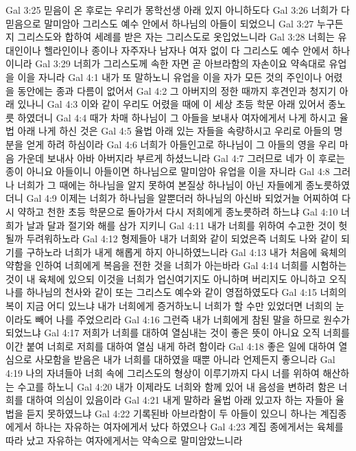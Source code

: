 Gal 3:25  믿음이 온 후로는 우리가 몽학선생 아래 있지 아니하도다
Gal 3:26  너희가 다 믿음으로 말미암아 그리스도 예수 안에서 하나님의 아들이 되었으니
Gal 3:27  누구든지 그리스도와 합하여 세례를 받은 자는 그리스도로 옷입었느니라
Gal 3:28  너희는 유대인이나 헬라인이나 종이나 자주자나 남자나 여자 없이 다 그리스도 예수 안에서 하나이니라
Gal 3:29  너희가 그리스도께 속한 자면 곧 아브라함의 자손이요 약속대로 유업을 이을 자니라
Gal 4:1  내가 또 말하노니 유업을 이을 자가 모든 것의 주인이나 어렸을 동안에는 종과 다름이 없어서
Gal 4:2  그 아버지의 정한 때까지 후견인과 청지기 아래 있나니
Gal 4:3  이와 같이 우리도 어렸을 때에 이 세상 초등 학문 아래 있어서 종노릇 하였더니
Gal 4:4  때가 차매 하나님이 그 아들을 보내사 여자에게서 나게 하시고 율법 아래 나게 하신 것은
Gal 4:5  율법 아래 있는 자들을 속량하시고 우리로 아들의 명분을 얻게 하려 하심이라
Gal 4:6  너희가 아들인고로 하나님이 그 아들의 영을 우리 마음 가운데 보내사 아바 아버지라 부르게 하셨느니라
Gal 4:7  그러므로 네가 이 후로는 종이 아니요 아들이니 아들이면 하나님으로 말미암아 유업을 이을 자니라
Gal 4:8  그러나 너희가 그 때에는 하나님을 알지 못하여 본질상 하나님이 아닌 자들에게 종노릇하였더니
Gal 4:9  이제는 너희가 하나님을 알뿐더러 하나님의 아신바 되었거늘 어찌하여 다시 약하고 천한 초등 학문으로 돌아가서 다시 저희에게 종노릇하려 하느냐
Gal 4:10  너희가 날과 달과 절기와 해를 삼가 지키니
Gal 4:11  내가 너희를 위하여 수고한 것이 헛될까 두려워하노라
Gal 4:12  형제들아 내가 너희와 같이 되었은즉 너희도 나와 같이 되기를 구하노라 너희가 내게 해롭게 하지 아니하였느니라
Gal 4:13  내가 처음에 육체의 약함을 인하여 너희에게 복음을 전한 것을 너희가 아는바라
Gal 4:14  너희를 시험하는 것이 내 육체에 있으되 이것을 너희가 업신여기지도 아니하며 버리지도 아니하고 오직 나를 하나님의 천사와 같이 또는 그리스도 예수와 같이 영접하였도다
Gal 4:15  너희의 복이 지금 어디 있느냐 내가 너희에게 증거하노니 너희가 할 수만 있었더면 너희의 눈이라도 빼어 나를 주었으리라
Gal 4:16  그런즉 내가 너희에게 참된 말을 하므로 원수가 되었느냐
Gal 4:17  저희가 너희를 대하여 열심내는 것이 좋은 뜻이 아니요 오직 너희를 이간 붙여 너희로 저희를 대하여 열심 내게 하려 함이라
Gal 4:18  좋은 일에 대하여 열심으로 사모함을 받음은 내가 너희를 대하였을 때뿐 아니라 언제든지 좋으니라
Gal 4:19  나의 자녀들아 너희 속에 그리스도의 형상이 이루기까지 다시 너를 위하여 해산하는 수고를 하노니
Gal 4:20  내가 이제라도 너희와 함께 있어 내 음성을 변하려 함은 너희를 대하여 의심이 있음이라
Gal 4:21  내게 말하라 율법 아래 있고자 하는 자들아 율법을 듣지 못하였느냐
Gal 4:22  기록된바 아브라함이 두 아들이 있으니 하나는 계집종에게서 하나는 자유하는 여자에게서 났다 하였으나
Gal 4:23  계집 종에게서는 육체를 따라 났고 자유하는 여자에게서는 약속으로 말미암았느니라
